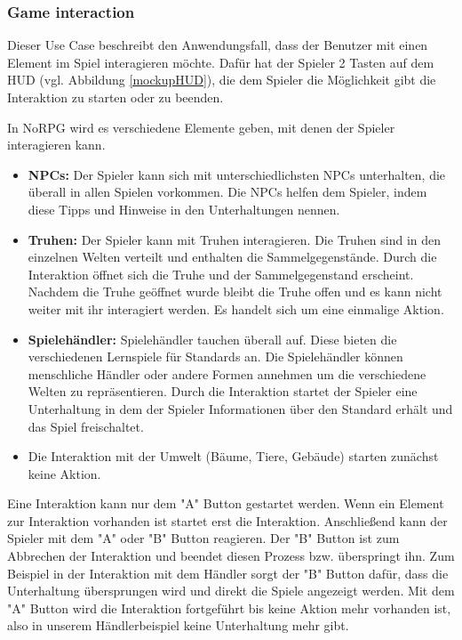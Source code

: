 		\subsubsection{Game interaction}
			Dieser Use Case beschreibt den Anwendungsfall, dass der Benutzer mit einen Element im Spiel interagieren möchte. Dafür hat der Spieler 2 Tasten auf dem HUD (vgl. Abbildung \ref{mockupHUD}), die dem Spieler die Möglichkeit gibt die Interaktion zu starten oder zu beenden.
			
			In NoRPG wird es verschiedene Elemente geben, mit denen der Spieler interagieren kann.
			
			\begin{itemize}
				\item {\textbf{NPCs:} Der Spieler kann sich mit unterschiedlichsten NPCs unterhalten, die überall in allen Spielen vorkommen. Die NPCs helfen dem Spieler, indem diese Tipps und Hinweise in den Unterhaltungen nennen.}
				\item {\textbf{Truhen:} Der Spieler kann mit Truhen interagieren. Die Truhen sind in den einzelnen Welten verteilt und enthalten die Sammelgegenstände. Durch die Interaktion öffnet sich die Truhe und der Sammelgegenstand erscheint. Nachdem die Truhe geöffnet wurde bleibt die Truhe offen und es kann nicht weiter mit ihr interagiert werden. Es handelt sich um eine einmalige Aktion.}
				\item {\textbf{Spielehändler:} Spielehändler tauchen überall auf. Diese bieten die verschiedenen Lernspiele für Standards an. Die Spielehändler können menschliche Händler oder andere Formen annehmen um die verschiedene Welten zu repräsentieren. Durch die Interaktion startet der Spieler eine Unterhaltung in dem der Spieler Informationen über den Standard erhält und das Spiel freischaltet.}
				\item {Die Interaktion mit der Umwelt (Bäume, Tiere, Gebäude) starten zunächst keine Aktion.}
			\end{itemize}
			
			Eine Interaktion kann nur dem "A" Button gestartet werden. Wenn ein Element zur Interaktion vorhanden ist startet erst die Interaktion. Anschließend kann der Spieler mit dem "A" oder "B" Button reagieren. Der "B" Button ist zum Abbrechen der Interaktion und beendet diesen Prozess bzw. überspringt ihn. Zum Beispiel in der Interaktion mit dem Händler sorgt der "B" Button dafür, dass die Unterhaltung übersprungen wird und direkt die Spiele angezeigt werden. Mit dem "A" Button wird die Interaktion fortgeführt bis keine Aktion mehr vorhanden ist, also in unserem Händlerbeispiel keine Unterhaltung mehr gibt.
			
